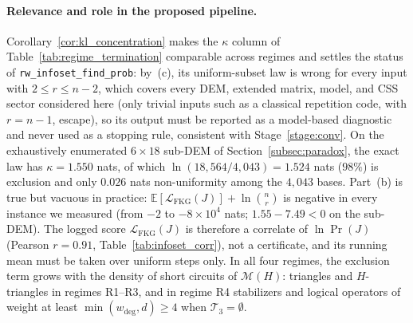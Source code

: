 \documentclass[12pt]{article}
\theoremstyle{definition}
\newcommand{\E}{\mathbb{E}}
\newcommand{\Tc}{\mathcal{T}_3}
\newcommand{\LFKG}{\mathcal{L}_{\mathrm{FKG}}}
\newcommand{\ttt}[1]{\texttt{#1}}
\begin{document}
\paragraph{Relevance and role in the proposed pipeline.}
Corollary~\ref{cor:kl_concentration} makes the $\kappa$ column of Table~\ref{tab:regime_termination} comparable across
regimes and settles the status of \ttt{rw\_infoset\_find\_prob}: by~(c), its uniform-subset law is wrong for every
input with $2 \le r \le n - 2$, which covers every DEM, extended matrix, model, and CSS sector considered here (only
trivial inputs such as a classical repetition code, with $r = n - 1$, escape), so its output must be reported as a
model-based diagnostic and never used as a stopping rule, consistent with Stage~\ref{stage:conv}.
On the exhaustively enumerated
$6 \times 18$ sub-DEM of Section~\ref{subsec:paradox}, the exact law has $\kappa = 1.550$ nats, of which $\ln(18{,}564
/ 4{,}043) = 1.524$ nats ($98\%$) is exclusion and only $0.026$ nats non-uniformity among the $4{,}043$ bases.
Part~(b) is true but vacuous in practice: $\E[\LFKG(J)] + \ln\binom{n}{r}$ is negative in every instance we measured
(from $-2$ to $-8 \times 10^4$ nats; $1.55 - 7.49 < 0$ on the sub-DEM). The logged score $\LFKG(J)$ is therefore a
correlate of $\ln \Pr(J)$ (Pearson $r = 0.91$, Table~\ref{tab:infoset_corr}), not a certificate, and its running mean
must be taken over uniform steps only. In all four regimes, the exclusion term grows with the density of short
circuits of $\mathcal{M}(H)$: triangles and $H$-triangles in regimes R1--R3, and in regime R4 stabilizers and logical
operators of weight at least $\min(w_{\deg}, d) \ge 4$ when $\Tc = \emptyset$.
\end{document}
